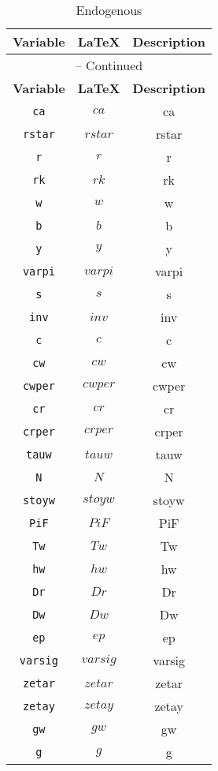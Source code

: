 \begin{center}
\begin{longtable}{ccc}
\caption{Endogenous}\\%
\hline%
\multicolumn{1}{c}{\textbf{Variable}} &
\multicolumn{1}{c}{\textbf{\LaTeX}} &
\multicolumn{1}{c}{\textbf{Description}}\\%
\hline\hline%
\endfirsthead
\multicolumn{3}{c}{{\tablename} \thetable{} -- Continued}\\%
\hline%
\multicolumn{1}{c}{\textbf{Variable}} &
\multicolumn{1}{c}{\textbf{\LaTeX}} &
\multicolumn{1}{c}{\textbf{Description}}\\%
\hline\hline%
\endhead
\texttt{ca} & $ca$ & ca\\
\texttt{rstar} & $rstar$ & rstar\\
\texttt{r} & $r$ & r\\
\texttt{rk} & $rk$ & rk\\
\texttt{w} & $w$ & w\\
\texttt{b} & $b$ & b\\
\texttt{y} & $y$ & y\\
\texttt{varpi} & $varpi$ & varpi\\
\texttt{s} & $s$ & s\\
\texttt{inv} & $inv$ & inv\\
\texttt{c} & $c$ & c\\
\texttt{cw} & $cw$ & cw\\
\texttt{cwper} & $cwper$ & cwper\\
\texttt{cr} & $cr$ & cr\\
\texttt{crper} & $crper$ & crper\\
\texttt{tauw} & $tauw$ & tauw\\
\texttt{N} & $N$ & N\\
\texttt{stoyw} & $stoyw$ & stoyw\\
\texttt{PiF} & $PiF$ & PiF\\
\texttt{Tw} & $Tw$ & Tw\\
\texttt{hw} & $hw$ & hw\\
\texttt{Dr} & $Dr$ & Dr\\
\texttt{Dw} & $Dw$ & Dw\\
\texttt{ep} & $ep$ & ep\\
\texttt{varsig} & $varsig$ & varsig\\
\texttt{zetar} & $zetar$ & zetar\\
\texttt{zetay} & $zetay$ & zetay\\
\texttt{gw} & $gw$ & gw\\
\texttt{g} & $g$ & g\\

\end{longtable}
\end{center}
